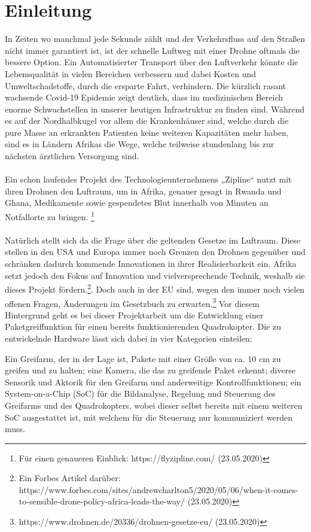 \chapter{Einleitung}
In Zeiten wo manchmal jede Sekunde zählt und der Verkehrsfluss auf den Straßen nicht immer garantiert ist, ist der schnelle Luftweg mit einer Drohne oftmals die bessere Option. Ein Automatisierter Transport über den Luftverkehr könnte die Lebensqualität in vielen Bereichen verbessern und dabei Kosten und Umweltschadstoffe, durch die ersparte Fahrt, verhindern. Die kürzlich rasant wachsende Covid-19 Epidemie zeigt deutlich, dass im medizinischen Bereich enorme Schwachstellen in unserer heutigen Infrastruktur zu finden sind. Während es auf der Nordhalbkugel vor allem die Krankenhäuser sind, welche durch die pure Masse an erkrankten Patienten keine weiteren Kapazitäten mehr haben, sind es in Ländern Afrikas die Wege, welche teilweise stundenlang bis zur nächsten ärztlichen Versorgung sind.\\
\\
Ein schon laufendes Projekt des Technologieunternehmens „Zipline“ nutzt mit ihren Drohnen den Luftraum, um in Afrika, genauer gesagt in Rwanda und Ghana, Medikamente sowie gespendetes Blut innerhalb von Minuten an Notfallorte zu bringen. \footnote[1]{Für einen genaueren Einblick: https://flyzipline.com/ (23.05.2020)}\\
\\
Natürlich stellt sich da die Frage über die geltenden Gesetze im Luftraum. Diese stellen in den USA und Europa immer noch Grenzen den Drohnen gegenüber und schränken dadurch kommende Innovationen in ihrer Realisierbarkeit ein. Afrika setzt jedoch den Fokus auf Innovation und vielversprechende Technik, weshalb sie dieses Projekt fördern.\footnote[2]{Ein Forbes Artikel darüber: https://www.forbes.com/sites/andrewcharlton5/2020/05/06/when-it-comes-to-sensible-drone-policy-africa-leads-the-way/ (23.05.2020)}. Doch auch in der EU sind, wegen den immer noch vielen offenen Fragen, Änderungen im Gesetzbuch zu erwarten.\footnote[3]{https://www.drohnen.de/20336/drohnen-gesetze-eu/ (23.05.2020)} 
\newpage
Vor diesem Hintergrund geht es bei dieser Projektarbeit um die Entwicklung einer Paketgreiffunktion für einen
bereits funktionierenden Quadrokopter. Die zu entwickelnde Hardware lässt sich dabei
in vier Kategorien einteilen: 

Ein Greifarm, der in der Lage ist, Pakete mit einer Größe
von ca. 10 cm zu greifen und zu halten; eine Kamera, die das zu greifende Paket
erkennt; diverse Sensorik und Aktorik für den Greifarm und anderweitige
Kontrollfunktionen; ein System-on-a-Chip (SoC) für die Bildanalyse, Regelung und
Steuerung des Greifarms und des Quadrokopters, wobei dieser selbst bereits mit
einem weiteren SoC ausgestattet ist, mit welchem für die Steuerung nur kommuniziert
werden muss.

